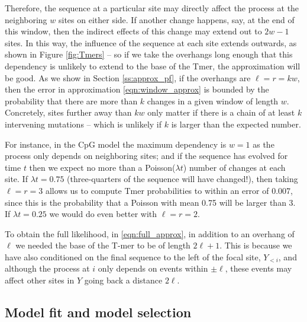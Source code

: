 \documentclass{article}
\theoremstyle{plain}
\theoremstyle{definition}
\begin{document}
Therefore, the sequence at a particular site may directly affect the process at the neighboring $w$ sites on either side.
If another change happens, say, at the end of this window,
then the indirect effects of this change may extend out to $2w-1$ sites.
In this way, the influence of the sequence at each site extends outwards, as shown in Figure \ref{fig:Tmers} --
so if we take the overhangs long enough that this dependency is unlikely to extend to the base of the Tmer,
the approximation will be good.
As we show in Section \ref{ss:approx_pf}, if the overhangs are $\ell = r = kw$,
then the error in approximation \eqref{eqn:window_approx}
is bounded by the probability that there are more than $k$ changes in a given window of length $w$.
Concretely, sites further away than $kw$ only matter if there is a chain of at least $k$ intervening mutations
-- which is unlikely if $k$ is larger than the expected number.

For instance, in the CpG model the maximum dependency is $w=1$ as the process only depends on neighboring sites;
and if the sequence has evolved for time $t$ then we expect no more than a Poisson($\lambda t$) number of changes at each site.
If $\lambda t = 0.75$ (three-quarters of the sequence will have changed!),
then taking $\ell = r = 3$ allows us to compute Tmer probabilities to within an error of 0.007,
since this is the probability that a Poisson with mean 0.75 will be larger than 3.
If $\lambda t = 0.25$ we would do even better with $\ell = r = 2$.

To obtain the full likelihood, in \eqref{eqn:full_approx}, in addition to an overhang of $\ell$
we needed the base of the T-mer to be of length $2\ell+1$.
This is because we have also conditioned on the final sequence to the left of the focal site, $Y_{<i}$,
and although the process at $i$ only depends on events within $\pm \ell$,
these events may affect other sites in $Y$ going back a distance $2\ell$.


\subsection{Model fit and model selection}
\end{document}
